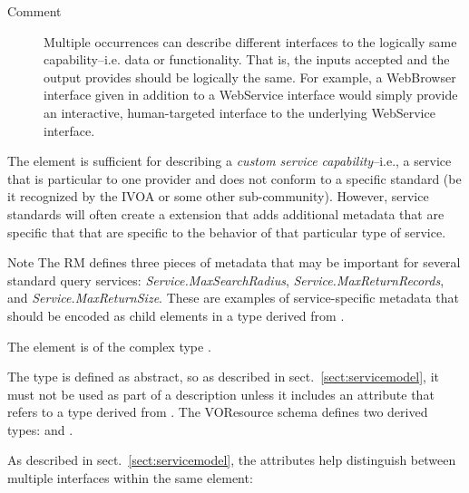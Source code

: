 \documentclass[11pt,a4paper]{ivoa}
\begin{document}
\begin{generated}
\begin{bigdescription}
\begin{description}
\item[Comment] 
                  Multiple occurrences can describe different interfaces to 
                  the logically same capability--i.e. data or functionality.
                  That is, the inputs accepted and the output provides should
                  be logically the same.  For example, a WebBrowser interface
                  given in addition to a WebService interface would simply 
                  provide an interactive, human-targeted interface to the 
                  underlying WebService interface.  
               

\end{description}


\end{bigdescription}\endgroup

\endgroup
\end{generated}



The  element is sufficient for describing a
\emph{custom service capability}--i.e., a service that is
particular to one provider and does not conform to a specific standard 
(be it recognized by the IVOA or some other sub-community).  However,
service standards will often create a 
extension that adds additional metadata that are specific that that
are specific to the behavior of that particular type of service.  



\begin{admonition}{Note}
The RM defines three pieces of metadata that may be
important for several standard query services:
\emph{Service.MaxSearchRadius},
\emph{Service.MaxReturnRecords}, and
\emph{Service.MaxReturnSize}.  These are examples of
service-specific metadata that should be encoded as child
elements in a type derived from .  
\end{admonition}


The  element is of the complex type 
.

The  type is defined as abstract, so as described in
sect.~\ref{sect:servicemodel}, it must not be
used as part of a  description unless it includes an
 attribute that refers to a type derived from
. The VOResource schema defines two derived
 types:  and
.

As described in sect.~\ref{sect:servicemodel}, the 
attributes help distinguish between multiple interfaces within the same
 element:
\end{document}
